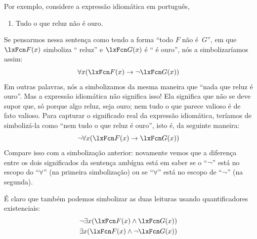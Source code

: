 Por exemplo, considere a expressão idiomática em português,
\begin{enumerate}
	\item\label{glitters}
	Tudo o que reluz não é ouro.
\end{enumerate}
Se pensarmos nessa sentença como tendo a forma \textquotedblleft todo $F$ não é~$G$\textquotedblright{}, em que $\atom{F}{x}$ simboliza \textquotedblleft {} reluz\textquotedblright{} e $\atom{G}{x}$ é \textquotedblleft {} é ouro\textquotedblright{}, nós a simbolizaríamos assim:
\[\forall x(\atom{F}{x} \eif \enot \atom{G}{x})\]
Em outras palavras, nós a simbolizamos da mesma maneira que \textquotedblleft nada que reluz é ouro\textquotedblright{}. Mas a expressão idiomática não significa isso! Ela significa que não se deve supor que, só porque algo reluz, seja ouro; nem tudo o que parece valioso é de fato valioso. Para capturar o significado real da expressão idiomática, teríamos de simbolizá-la como \textquotedblleft nem tudo o que reluz é ouro\textquotedblright{}, isto é, da seguinte maneira:
\[\enot\forall x(\atom{F}{x} \eif \atom{G}{x})\]
Compare isso com a simbolização anterior: novamente vemos que a diferença entre os dois significados da sentença ambígua está em saber se o \textquotedblleft $\neg$\textquotedblright{} está no escopo do \textquotedblleft $\forall$\textquotedblright{} (na primeira simbolização) ou se \textquotedblleft $\forall$\textquotedblright{} está no escopo de \textquotedblleft $\neg$\textquotedblright{} (na segunda).

É claro que também podemos simbolizar as duas leituras usando quantificadores existenciais:
\begin{align*}
	& \enot\exists x(\atom{F}{x} \eand \atom{G}{x}) \\
	& \exists x(\atom{F}{x} \eand \enot \atom{G}{x})
\end{align*}

